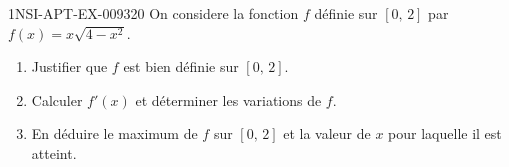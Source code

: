 \begin{exercice}{1NSI-APT-EX-009}{3}{20}
On considere la fonction $f$ définie sur $[0,\, 2]$ par $f(x) = x\sqrt{4 - x^2}$.
\begin{enumerate}
  \item Justifier que $f$ est bien définie sur $[0,\, 2]$.
  \item Calculer $f'(x)$ et déterminer les variations de $f$.
  \item En déduire le maximum de $f$ sur $[0,\, 2]$ et la valeur de $x$ pour laquelle il est atteint.
\end{enumerate}

\end{exercice}
